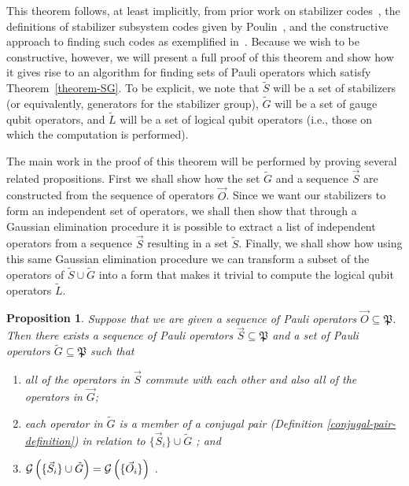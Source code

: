 \documentclass[twocolumn,showpacs,preprintnumbers,amsmath,amssymb,nofootinbib,pra,floatfix]{revtex4-1}
\newtheorem{proposition}{Proposition}
\newenvironment{remark}[1][Remark]{\begin{trivlist}
\item[\hskip \labelsep {\bfseries #1}]}{\end{trivlist}}
\newcommand{\lst}{\vec}
\newcommand{\set}{\tilde}
\newcommand{\genfun}{\mathcal{G}}
\newcommand{\pauligroup}{\mathfrak{P}}
\begin{document}
\begin{remark}
This theorem follows, at least implicitly, from prior work on stabilizer codes~\cite{Gottesman:97a}, the definitions of stabilizer subsystem codes given by Poulin~\cite{Poulin:05a}, and the constructive approach to finding such codes as exemplified in~\cite{Bacon:06a}.  Because we wish to be constructive, however, we will present a full proof of this theorem and show how it gives rise to an algorithm for finding sets of Pauli operators which satisfy Theorem~\ref{theorem-SG}.  To be explicit, we note that $\set S$ will be a set of stabilizers (or equivalently, generators for the stabilizer group), $\set G$ will be a set of gauge qubit operators, and $\set L$ will be a set of logical qubit operators (i.e., those on which the computation is performed).

The main work in the proof of this theorem will be performed by proving several related propositions.  First we shall show how the set $\set G$ and a sequence $\lst S$ are constructed from the sequence of operators $\lst O$.  Since we want our stabilizers to form an independent set of operators, we shall then show that through a Gaussian elimination procedure it is possible to extract a list of independent operators from a sequence $\lst S$ resulting in a set $\set S$.  Finally, we shall show how using this same Gaussian elimination procedure we can transform a subset of the operators of $\set S\cup\set G$ into a form that makes it trivial to compute the logical qubit operators $\set L$.
\end{remark}
\begin{proposition} \label{proposition-SG} Suppose that we are given a sequence of Pauli operators $\lst O\subseteq \pauligroup$.  Then there exists a sequence of Pauli operators $\lst S\subseteq\pauligroup$ and a set of Pauli operators $\set G\subseteq\pauligroup$ such that
\begin{enumerate}
\item all of the operators in $\lst S$ commute with each other and also all of the operators in $\lst G$; \label{stabs-commute-with-G}
\item each operator in $\set G$ is a member of a \emph{conjugal pair} (Definition \ref{conjugal-pair-definition}) in relation to $\{\lst S_i\} \cup \set G $ \label{conjugal-pairs-commute-with-SAG}; and
\item $\genfun\paren{\{\lst S_i\}\cup \set G}=\genfun\paren{\{\lst O_i\}}$ \label{SAG-spans-all}.
\end{enumerate}
\end{proposition}
\end{document}
